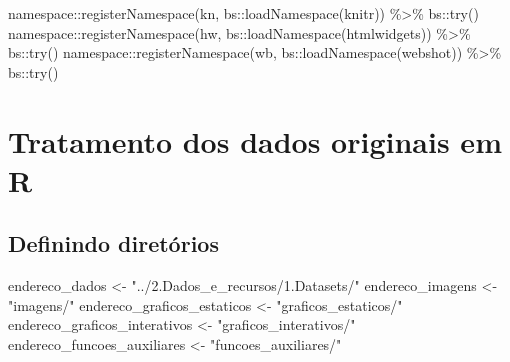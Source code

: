 \documentclass[
]{article}
\newenvironment{Shaded}{\begin{snugshade}}{\end{snugshade}}
\newcommand{\FunctionTok}[1]{\textcolor[rgb]{0.00,0.00,0.00}{#1}}
\newcommand{\NormalTok}[1]{#1}
\newcommand{\OtherTok}[1]{\textcolor[rgb]{0.56,0.35,0.01}{#1}}
\newcommand{\SpecialCharTok}[1]{\textcolor[rgb]{0.00,0.00,0.00}{#1}}
\newcommand{\StringTok}[1]{\textcolor[rgb]{0.31,0.60,0.02}{#1}}
\begin{document}
\begin{Shaded}
\begin{Highlighting}[]
\NormalTok{namespace}\SpecialCharTok{::}\FunctionTok{registerNamespace}\NormalTok{(}\StringTok{\textquotesingle{}kn\textquotesingle{}}\NormalTok{, bs}\SpecialCharTok{::}\FunctionTok{loadNamespace}\NormalTok{(}\StringTok{\textquotesingle{}knitr\textquotesingle{}}\NormalTok{)) }\SpecialCharTok{\%\textgreater{}\%}\NormalTok{ bs}\SpecialCharTok{::}\FunctionTok{try}\NormalTok{()}
\NormalTok{namespace}\SpecialCharTok{::}\FunctionTok{registerNamespace}\NormalTok{(}\StringTok{\textquotesingle{}hw\textquotesingle{}}\NormalTok{, bs}\SpecialCharTok{::}\FunctionTok{loadNamespace}\NormalTok{(}\StringTok{\textquotesingle{}htmlwidgets\textquotesingle{}}\NormalTok{)) }\SpecialCharTok{\%\textgreater{}\%}\NormalTok{ bs}\SpecialCharTok{::}\FunctionTok{try}\NormalTok{()}
\NormalTok{namespace}\SpecialCharTok{::}\FunctionTok{registerNamespace}\NormalTok{(}\StringTok{\textquotesingle{}wb\textquotesingle{}}\NormalTok{, bs}\SpecialCharTok{::}\FunctionTok{loadNamespace}\NormalTok{(}\StringTok{\textquotesingle{}webshot\textquotesingle{}}\NormalTok{)) }\SpecialCharTok{\%\textgreater{}\%}\NormalTok{ bs}\SpecialCharTok{::}\FunctionTok{try}\NormalTok{()}
\end{Highlighting}
\end{Shaded}

\hypertarget{tratamento-dos-dados-originais-em-r}{%
\section{Tratamento dos dados originais em
R}\label{tratamento-dos-dados-originais-em-r}}

\hypertarget{definindo-diretuxf3rios}{%
\subsection{Definindo diretórios}\label{definindo-diretuxf3rios}}

\begin{Shaded}
\begin{Highlighting}[]
\NormalTok{endereco\_dados }\OtherTok{\textless{}{-}} \StringTok{"../2.Dados\_e\_recursos/1.Datasets/"}
\NormalTok{endereco\_imagens }\OtherTok{\textless{}{-}} \StringTok{"imagens/"}
\NormalTok{endereco\_graficos\_estaticos }\OtherTok{\textless{}{-}} \StringTok{"graficos\_estaticos/"} 
\NormalTok{endereco\_graficos\_interativos }\OtherTok{\textless{}{-}} \StringTok{"graficos\_interativos/"}
\NormalTok{endereco\_funcoes\_auxiliares }\OtherTok{\textless{}{-}} \StringTok{"funcoes\_auxiliares/"}
\end{Highlighting}
\end{Shaded}
\end{document}

